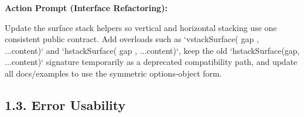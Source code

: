 \textbf{Action Prompt (Interface Refactoring):}

\begin{CodeBlock}
Update the surface stack helpers so vertical and horizontal stacking use one consistent public contract. Add overloads such as `vstackSurface({ gap }, ...content)` and `hstackSurface({ gap }, ...content)`, keep the old `hstackSurface(gap, ...content)` signature temporarily as a deprecated compatibility path, and update all docs/examples to use the symmetric options-object form.
\end{CodeBlock}

\subsection{1.3. Error Usability}\label{record-416-error-usability}

